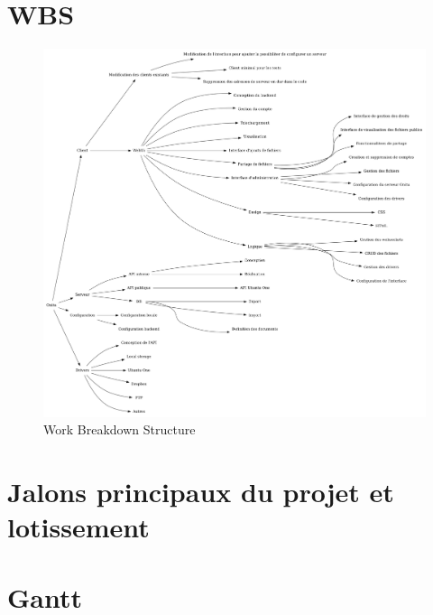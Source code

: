 \section{WBS}
\newpage
\begin{figure}[ht]
    \includegraphics[width=\textwidth,height=\textheight,keepaspectratio]{wbs.png}
    \caption{Work Breakdown Structure}
\end{figure}

\newpage

\section{Jalons principaux du projet et lotissement}


\section{Gantt}

